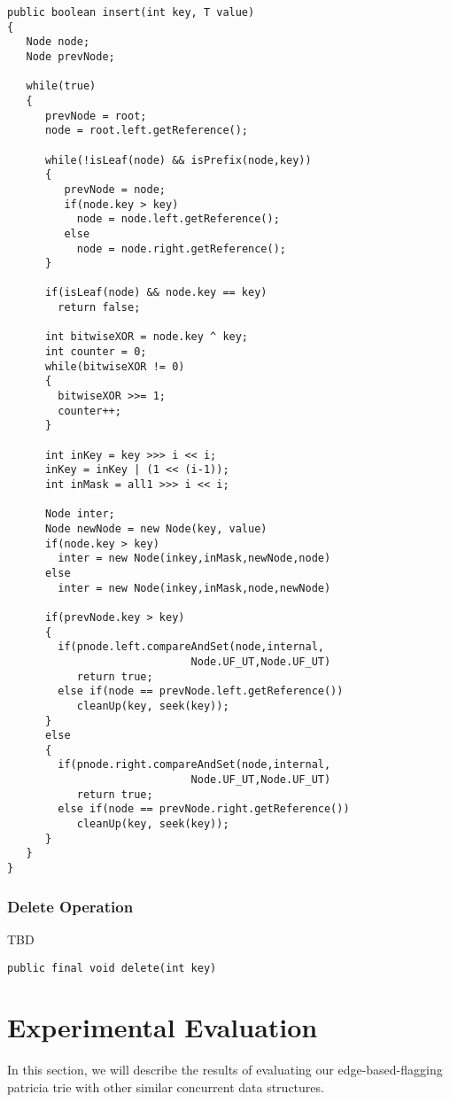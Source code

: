 \documentclass[conference]{IEEEtran}
\begin{document}
\begin{lstlisting}[frame=lines]
public boolean insert(int key, T value)
{
   Node node;
   Node prevNode;

   while(true)
   {
      prevNode = root;
      node = root.left.getReference();
      
      while(!isLeaf(node) && isPrefix(node,key))
      {
         prevNode = node;
         if(node.key > key)
           node = node.left.getReference();
         else
           node = node.right.getReference();
      }

      if(isLeaf(node) && node.key == key)
        return false;

      int bitwiseXOR = node.key ^ key;
      int counter = 0;
      while(bitwiseXOR != 0)
      {
        bitwiseXOR >>= 1;
        counter++;
      }

      int inKey = key >>> i << i;
      inKey = inKey | (1 << (i-1));
      int inMask = all1 >>> i << i;

      Node inter;
      Node newNode = new Node(key, value)
      if(node.key > key)
        inter = new Node(inkey,inMask,newNode,node)
      else
        inter = new Node(inkey,inMask,node,newNode)

      if(prevNode.key > key)
      {
        if(pnode.left.compareAndSet(node,internal,
                             Node.UF_UT,Node.UF_UT)
           return true;   
        else if(node == prevNode.left.getReference())
           cleanUp(key, seek(key));
      }
      else
      {
        if(pnode.right.compareAndSet(node,internal,
                             Node.UF_UT,Node.UF_UT)
           return true;   
        else if(node == prevNode.right.getReference())
           cleanUp(key, seek(key));
      }
   }
}
\end{lstlisting}

\subsubsection{Delete Operation}
TBD

\begin{lstlisting}[frame=lines]
public final void delete(int key)
\end{lstlisting}

\section{Experimental Evaluation}
In this section, we will describe the results of evaluating our edge-based-flagging patricia trie with other similar concurrent data structures.
\end{document}
